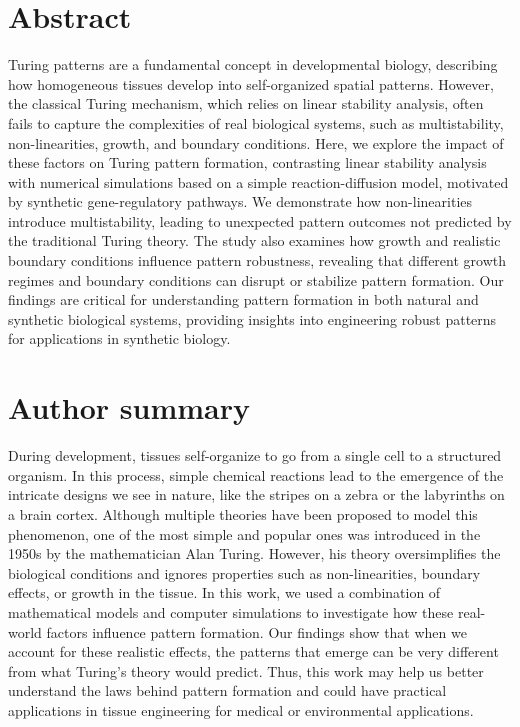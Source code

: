 \documentclass[10pt,letterpaper]{article}
\begin{document}
\section*{Abstract}
Turing patterns are a fundamental concept in developmental biology, describing how homogeneous tissues develop into self-organized spatial patterns. However, the classical Turing mechanism, which relies on linear stability analysis, often fails to capture the complexities of real biological systems, such as multistability, non-linearities, growth, and boundary conditions. Here, we explore the impact of these factors on Turing pattern formation, contrasting linear stability analysis with numerical simulations based on a simple reaction-diffusion model, motivated by synthetic gene-regulatory pathways. We demonstrate how non-linearities introduce multistability, leading to unexpected pattern outcomes not predicted by the traditional Turing theory. The study also examines how growth and realistic boundary conditions influence pattern robustness, revealing that different growth regimes and boundary conditions can disrupt or stabilize pattern formation. Our findings are critical for understanding pattern formation in both natural and synthetic biological systems, providing insights into engineering robust patterns for applications in synthetic biology.


\section*{Author summary}
During development, tissues self-organize to go from a single cell to a structured organism. In this process, simple chemical reactions lead to the emergence of the intricate designs we see in nature, like the stripes on a zebra or the labyrinths on a brain cortex. Although multiple theories have been proposed to model this phenomenon, one of the most simple and popular ones was introduced in the 1950s by the mathematician Alan Turing. However, his theory oversimplifies the biological conditions and ignores properties such as non-linearities, boundary effects, or growth in the tissue. In this work, we used a combination of mathematical models and computer simulations to investigate how these real-world factors influence pattern formation. Our findings show that when we account for these realistic effects, the patterns that emerge can be very different from what Turing's theory would predict. Thus, this work may help us better understand the laws behind pattern formation and could have practical applications in tissue engineering for medical or environmental applications. 
\end{document}
